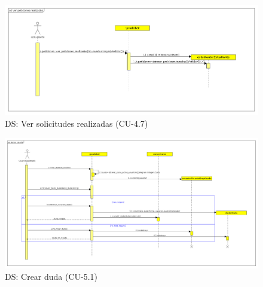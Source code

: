 \begin{figure}[H] %
\centering
\includegraphics[scale=0.3]{imagenes/diagramas/secuencia/analisis/ver_peticiones_realizadas.png}  %

\caption{DS: Ver solicitudes realizadas (CU-4.7) }\label{figura80}

\end{figure}


\begin{figure}[H] %
\centering
\includegraphics[scale=0.22]{imagenes/diagramas/secuencia/analisis/crear_duda.png}  %

\caption{DS: Crear duda (CU-5.1) }\label{figura81}

\end{figure}

